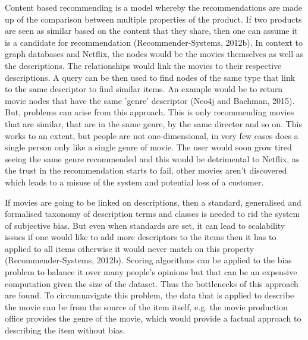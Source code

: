\documentclass[a4paper]{article}
\begin{document}
Content based recommending is a model whereby the recommendations are made up of the comparison between multiple properties of the product. If two products are seen as similar based on the content that they share, then one can assume it is a candidate for recommendation (Recommender-Systems, 2012b). In context to graph databases and Netflix, the nodes would be the movies themselves as well as the descriptions. The relationships would link the movies to their respective descriptions. A query can be then used to find nodes of the same type that link to the same descriptor to find similar items. An example would be to return movie nodes that have the same 'genre' descriptor (Neo4j and Bachman, 2015). But, problems can arise from this approach. This is only recommending movies that are similar, that are in the same genre, by the same director and so on. This works to an extent, but people are not one-dimensional, in very few cases does a single person only like a single genre of movie. The user would soon grow tired seeing the same genre recommended and this would be detrimental to Netflix, as the trust in the recommendation starts to fail, other movies aren't discovered which leads to a misuse of the system and potential loss of a customer.

If movies are going to be linked on descriptions, then a standard, generalised and formalised taxonomy of description terms and classes is needed to rid the system of subjective bias. But even when standards are set, it can lead to scalability issues if one would like to add more descriptors to the items then it has to applied to all items otherwise it would never match on this property (Recommender-Systems, 2012b). Scoring algorithms can be applied to the bias problem to balance it over many people's opinions but that can be an expensive computation given the size of the dataset. Thus the bottlenecks of this approach are found. To circumnavigate this problem, the data that is applied to describe the movie can be from the source of the item itself, e.g. the movie production office provides the genre of the movie, which would provide a factual approach to describing the item without bias.
\end{document}
